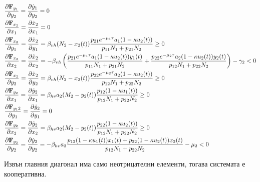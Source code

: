 \begin{align*}
  &\pdv{\mathbf{F}_{y_1}}{y_2} = \pdv{\dot{y}_1}{y_2} = 0 \\
  &\pdv{\mathbf{F}_{x_2}}{x_1} = \pdv{\dot{x}_2}{x_1} = 0 \\
  &\pdv{\mathbf{F}_{x_2}}{y_1} = \pdv{\dot{x}_2}{y_1} = \beta_{vh} (N_2-x_2(t)) \frac{p_{21} e^{-\mu_1 \tau} a_1 (1-\kappa u_2(t))}{p_{11} N_1 + p_{21} N_2} \geq 0 \\
  &\pdv{\mathbf{F}_{x_2}}{x_2} = \pdv{\dot{x}_2}{x_2} = -\beta_{vh} \left(\frac{p_{21} e^{-\mu_1 \tau} a_1 (1-\kappa u_2(t)) y_1(t)}{p_{11} N_1 + p_{21} N_2} + \frac{p_{22} e^{-\mu_2 \tau} a_2 (1-\kappa u_2(t)) y_2(t)}{p_{12} N_1 + p_{22} N_2}\right) - \gamma_2 < 0 \\
  &\pdv{\mathbf{F}_{x_2}}{y_2} = \pdv{\dot{x}_2}{y_2} = \beta_{vh} (N_2-x_2(t)) \frac{p_{22} e^{-\mu_2 \tau} a_2 (1-\kappa u_2(t))}{p_{12} N_1 + p_{22} N_2} \geq 0 \\
  &\pdv{\mathbf{F}_{y_2}}{x_1} = \pdv{\dot{y}_2}{x_1} = \beta_{hv} a_2 (M_2-y_2(t)) \frac{p_{12} (1-\kappa u_1(t))}{p_{12} N_1 + p_{22} N_2} \geq 0 \\
  &\pdv{\mathbf{F}_{y_12}}{y_1} = \pdv{\dot{y}_2}{y_1} = 0 \\
  &\pdv{\mathbf{F}_{y_2}}{x_2} = \pdv{\dot{y}_2}{x_2} = \beta_{hv} a_2 (M_2-y_2(t)) \frac{p_{22} (1-\kappa u_2(t))}{p_{12} N_1 + p_{22} N_2} \geq 0 \\
  &\pdv{\mathbf{F}_{y_2}}{y_2} = \pdv{\dot{y}_2}{y_2} = -\beta_{hv} a_2 \frac{p_{12} (1-\kappa u_1(t)) x_1(t) + p_{22} (1-\kappa u_2(t)) x_2(t)}{p_{12} N_1 + p_{22} N_2} - \mu_2 < 0
\end{align*}

Извън главния диагонал има само неотрицателни елементи, тогава системата е кооперативна.

